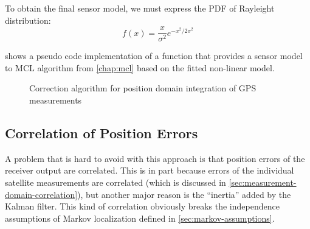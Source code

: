 To obtain the final sensor model, we must express the PDF of Rayleight distribution:
\begin{equation}
    f(x) = \frac{x}{\sigma^2}e^{-x^2/2\sigma^2}
\end{equation}

 shows a pseudo code implementation of a function
that provides a sensor model to MCL algorithm from \cref{chap:mcl} based on the
fitted non-linear model.

\begin{figure}[tp]
\begin{algorithm}[H]


\end{algorithm}
\caption{Correction algorithm for position domain integration of GPS measurements}
\label{algo:gps-position-domain}
\end{figure}

\subsection{Correlation of Position Errors}
\label{sec:position-domain-correlation}
A problem that is hard to avoid with this approach is that position errors of the
receiver output are correlated.
This is in part because errors of the individual satellite measurements are correlated
(which is discussed in \cref{sec:measurement-domain-correlation}), but another major reason
is the \enquote{inertia} added by the Kalman filter.
This kind of correlation obviously breaks the independence assumptions of Markov
localization defined in \cref{sec:markov-assumptions}.

